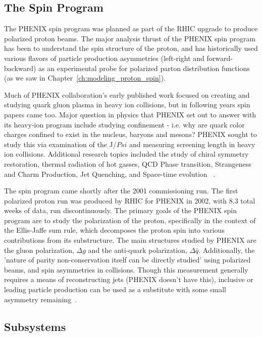 \subsection{The Spin Program}
The PHENIX spin program was planned as part of the RHIC upgrade to produce
polarized proton beams. The major analysis thrust of the PHENIX spin program has
been to understand the spin structure of the proton, and has historically used
various flavors of particle production asymmetries (left-right and
forward-backward) as an experimental probe for polarized parton distribution
functions (as we saw in Chapter~\ref{ch:modeling_proton_spin}).

Much of PHENIX collaboration's early published work focused on creating and
studying quark gluon plasma in heavy ion collisions, but in following years spin
papers came too. Major question in physics that PHENIX set out to answer with
its heavy-ion program include studying confinement - i.e.  why are quark color
charges confined to exist in the nucleus, baryons and mesons? PHENIX sought to
study this via examination of the J/$Psi$ and measuring screening length in
heavy ion collisions. Additional research topics included the study of chiral
symmetry restoration, thermal radiation of hot gasses, QCD Phase transition,
Strangeness and Charm Production, Jet Quenching, and Space-time
evolution~\cite{Nagamiya1994} .

The spin program came shortly after the 2001 commissioning run. The first
polarized proton run was produced by RHIC for PHENIX in 2002, with 8.3 total
weeks of data, run discontinuously. The primary goals of the PHENIX spin
program are to study the polarization of the proton, specifically in the context
of the Ellis-Jaffe sum rule, which decomposes the proton spin into various
contributions from its substructure. The main structures studied by PHENIX are
the gluon polarization, $\Delta g$ and the anti-quark polarization, $\Delta
\bar{q}$. Additionally, the 'nature of parity non-conservation itself can be
directly studied' using polarized beams, and spin asymmetries in collisions.
Though this measurement generally requires a means of reconstructing jets
(PHENIX doesn't have this), inclusive or leading particle production can be used
as a substitute with some small asymmetry
remaining~\cite{PHENIXCollaboration1998}.

\subsection{Subsystems}

